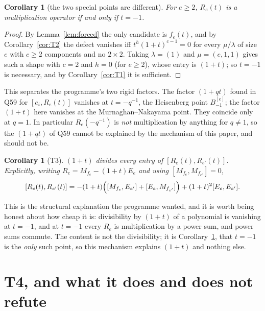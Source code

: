 \documentclass[11pt]{article}
\newtheorem{corollary}[theorem]{Corollary}
\theoremstyle{definition}
\begin{document}
\begin{corollary}[the two special points are different]\label{cor:mult}
For $e\ge2$, $R_e(t)$ is a multiplication operator if and only if $t=-1$.
\end{corollary}

\begin{proof}
By Lemma~\ref{lem:forced} the only candidate is $f_e(t)$, and by Corollary~\ref{cor:T2} the
defect vanishes iff $t^{h}(1+t)^{c-1}=0$ for every $\mu/\lambda$ of size $e$ with $c\ge2$
components and no $2\times2$. Taking $\lambda=(1)$ and $\mu=(e,1,1)$ gives such a shape with
$c=2$ and $h=0$ (for $e\ge2$), whose entry is $(1+t)$; so $t=-1$ is necessary, and by
Corollary~\ref{cor:T1} it is sufficient.
\end{proof}

This separates the programme's two rigid factors. The factor $(1+qt)$ found in Q59 for
$[e_i,R_e(t)]$ vanishes at $t=-q^{-1}$, the Heisenberg point $B^{[e]}_{-1}$; the factor $(1+t)$
here vanishes at the Murnaghan--Nakayama point. They coincide only at $q=1$. In particular
$R_e(-q^{-1})$ is \emph{not} multiplication by anything for $q\ne1$, so the $(1+qt)$ of Q59
cannot be explained by the mechanism of this paper, and should not be.

\begin{corollary}[T3]\label{cor:T3}
$(1+t)$ divides every entry of $[R_e(t),R_{e'}(t)]$. Explicitly, writing
$R_e=M_{f_e}-(1+t)E_e$ and using $[M_{f_e},M_{f_{e'}}]=0$,
\[
[R_e(t),R_{e'}(t)] = -(1+t)\Bigl([M_{f_e},E_{e'}]+[E_e,M_{f_{e'}}]\Bigr)
+(1+t)^2[E_e,E_{e'}].
\]
\end{corollary}

This is the structural explanation the programme wanted, and it is worth being honest about how
cheap it is: divisibility by $(1+t)$ of a polynomial is vanishing at $t=-1$, and at $t=-1$ every
$R_e$ is multiplication by a power sum, and power sums commute. The content is not the
divisibility; it is Corollary~\ref{cor:mult}, that $t=-1$ is the \emph{only} such point, so this
mechanism explains $(1+t)$ and nothing else.

\section{T4, and what it does and does not refute}\label{sec:q69}
\end{document}
